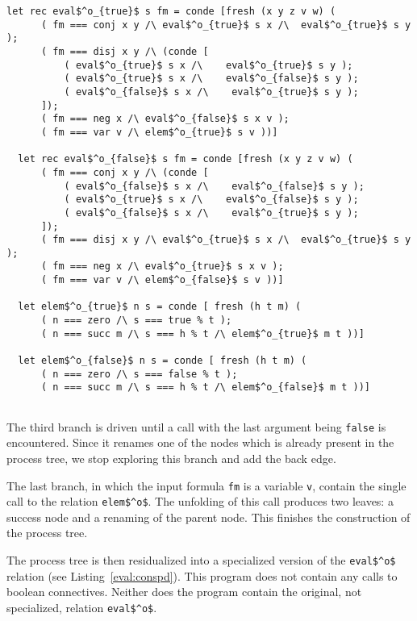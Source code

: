\begin{figure*}[!t]
  \centering
  \begin{minipage}{0.65\textwidth}
    \begin{lstlisting}[label={eval:conspd}, caption={Specialized evaluator of propositional formulas}, captionpos=b, frame=tb]
  let rec eval$^o_{true}$ s fm = conde [fresh (x y z v w) (
      ( fm === conj x y /\ eval$^o_{true}$ s x /\  eval$^o_{true}$ s y );
      ( fm === disj x y /\ (conde [
          ( eval$^o_{true}$ s x /\    eval$^o_{true}$ s y );
          ( eval$^o_{true}$ s x /\    eval$^o_{false}$ s y );
          ( eval$^o_{false}$ s x /\    eval$^o_{true}$ s y );
      ]);
      ( fm === neg x /\ eval$^o_{false}$ s x v );
      ( fm === var v /\ elem$^o_{true}$ s v ))]

  let rec eval$^o_{false}$ s fm = conde [fresh (x y z v w) (
      ( fm === conj x y /\ (conde [
          ( eval$^o_{false}$ s x /\    eval$^o_{false}$ s y );
          ( eval$^o_{true}$ s x /\    eval$^o_{false}$ s y );
          ( eval$^o_{false}$ s x /\    eval$^o_{true}$ s y );
      ]);
      ( fm === disj x y /\ eval$^o_{true}$ s x /\  eval$^o_{true}$ s y );
      ( fm === neg x /\ eval$^o_{true}$ s x v );
      ( fm === var v /\ elem$^o_{false}$ s v ))]

  let elem$^o_{true}$ n s = conde [ fresh (h t m) (
      ( n === zero /\ s === true % t );
      ( n === succ m /\ s === h % t /\ elem$^o_{true}$ m t ))]

  let elem$^o_{false}$ n s = conde [ fresh (h t m) (
      ( n === zero /\ s === false % t );
      ( n === succ m /\ s === h % t /\ elem$^o_{false}$ m t ))]


    \end{lstlisting}
  \end{minipage}
\end{figure*}

The third branch is driven until a call with the last argument being \lstinline{false} is encountered.
Since it renames one of the nodes which is already present in the process tree, we stop exploring this branch and add the back edge.

The last branch, in which the input formula \lstinline{fm} is a variable \lstinline{v}, contain the single call to the relation \lstinline{elem$^o$}.
The unfolding of this call produces two leaves: a success node and a renaming of the parent node.
This finishes the construction of the process tree.

The process tree is then residualized into a specialized version of the \lstinline{eval$^o$} relation (see Listing~\ref{eval:conspd}).
This program does not contain any calls to boolean connectives.
Neither does the program contain the original, not specialized, relation \lstinline{eval$^o$}.

